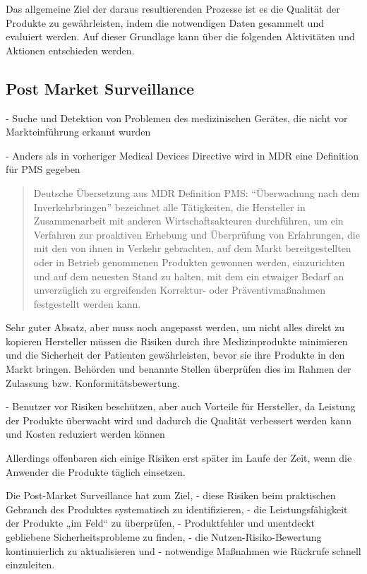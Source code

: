 \documentclass[a4paper,12pt]{report}
\begin{document}
Das allgemeine Ziel der daraus resultierenden Prozesse ist es die Qualität der Produkte zu gewährleisten, indem die notwendigen Daten gesammelt und evaluiert werden. Auf dieser Grundlage kann über die folgenden Aktivitäten und Aktionen entschieden werden.
\subsection{Post Market Surveillance}\label{subsec:PMS}
- Suche und Detektion von Problemen des medizinischen Gerätes, die nicht vor Markteinführung erkannt wurden \citep[vgl.][S. 213]{DeMarco2011}

- Anders als in vorheriger Medical Devices Directive wird in MDR eine Definition für PMS gegeben \citep[vgl.][S. 1]{Pugh2017}
\begin{quote}
Deutsche Übersetzung aus MDR 
Definition PMS:
"`Überwachung nach dem Inverkehrbringen"' bezeichnet alle Tätigkeiten, die Hersteller in Zusammenarbeit mit anderen Wirtschaftsakteuren durchführen, um ein Verfahren zur proaktiven Erhebung und Überprüfung von Erfahrungen, die mit den von ihnen in Verkehr gebrachten, auf dem Markt bereitgestellten oder in Betrieb genommenen Produkten gewonnen werden, einzurichten und auf dem neuesten Stand zu halten, mit dem ein etwaiger Bedarf an unverzüglich zu ergreifenden Korrektur- oder Präventivmaßnahmen festgestellt werden kann. \citep[Kapitel 1 Artikel 2 60.]{MDR2017}
\end{quote}

Sehr guter Absatz, aber muss noch angepasst werden, um nicht alles direkt zu kopieren \citep[vgl.][]{Johner2017}
Hersteller müssen die Risiken durch ihre Medizinprodukte minimieren und die Sicherheit der Patienten gewährleisten, bevor sie ihre Produkte in den Markt bringen. Behörden und benannte Stellen überprüfen dies im Rahmen der Zulassung bzw. Konformitätsbewertung.

- Benutzer vor Risiken beschützen, aber auch Vorteile für Hersteller, da Leistung der Produkte überwacht wird und dadurch die Qualität verbessert werden kann und Kosten reduziert werden können \citep[vgl.][S. 2]{Pugh2017}

Allerdings offenbaren sich einige Risiken erst später im Laufe der Zeit, wenn die Anwender die Produkte täglich einsetzen.

Die Post-Market Surveillance hat zum Ziel,
- diese Risiken beim praktischen Gebrauch des Produktes systematisch zu identifizieren,
- die Leistungsfähigkeit der Produkte „im Feld“ zu überprüfen,
- Produktfehler und unentdeckt gebliebene Sicherheitsprobleme zu finden,
- die Nutzen-Risiko-Bewertung kontinuierlich zu aktualisieren und
- notwendige Maßnahmen wie Rückrufe schnell einzuleiten.
\citep[vgl.][]{Johner2017}
\end{document}
